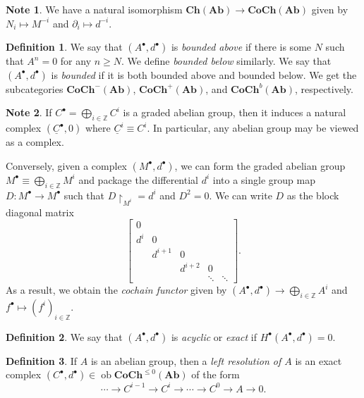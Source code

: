\documentclass[10pt,letterpaper,cm]{nupset}
\theoremstyle{definition}
\newtheorem*{definition}{Definition}
\newtheorem{note}{Note}
\newcommand{\Z}{\mathbb Z}
\newcommand{\1}{\mathbf{1}}
\newcommand{\0}{\vec 0}
\DeclareMathOperator{\ob}{ob}
\begin{document}
\begin{note}
We have a natural isomorphism $\mathbf{Ch}(\mathbf{Ab}) \to \mathbf{CoCh}(\mathbf{Ab})$ given by $N_i \mapsto M^{-i}$ and $\partial_i \mapsto d^{-i}$.
\end{note}

\begin{definition}
We say that $(A^{\bullet}, d^{\bullet})$ is \textit{bounded above} if there is some $N$ such that $A^n =0$ for any $n\geq N$. We define \textit{bounded below} similarly. We say that $(A^{\bullet}, d^{\bullet})$ is \textit{bounded} if it is both bounded above and bounded below. We get the subcategories $\mathbf{CoCh}^{{-}}(\mathbf{Ab})$, $\mathbf{CoCh}^{+}(\mathbf{Ab})$, and $\mathbf{CoCh}^{b}(\mathbf{Ab})$, respectively. 
\end{definition}

\begin{note}
If $C^{\bullet} = \bigoplus_{i\in \Z} C^i$ is a graded abelian group, then it induces a natural complex $(\underline{C}^{\bullet}, 0)$ where $\underline{C}^i \equiv C^i$. In particular, any abelian group may be viewed as a complex. 

Conversely, given a complex $(M^{\bullet}, d^{\bullet})$, we can form the graded abelian group $M^{\bullet} \equiv  \bigoplus_{i\in \Z} M^i$ and package the differential $d^i$ into a single group map $D: M^{\bullet} \to M^{\bullet}$ such that $D\restriction_{M^i} = d^i$ and $D^2 =0$. We can write $D$ as the block diagonal matrix
$$  \begin{bmatrix} 0 & & &  & \\  d^i &0   &  &  & \\  &  d^{i+1} & 0  &   & \\ &   & d^{i+2}  & 0   &   \\  &  & &  \ddots &   \ddots \end{bmatrix} .$$
As a result, we obtain the \textit{cochain functor} given by $(A^{\bullet}, d^{\bullet}) \to \bigoplus_{i\in \Z} A^i$ and $f^{\bullet} \mapsto (f^i)_{i\in \Z}$.
\end{note}

\begin{definition}
We say that $(A^{\bullet}, d^{\bullet})$ is \textit{acyclic} or \textit{exact} if $H^{\bullet}(A^{\bullet}, d^{\bullet})=0$.
\end{definition}

\begin{definition}
If $A$ is an abelian group, then a \textit{left resolution of $A$} is an exact complex $(C^{\bullet}, d^{\bullet}) \in \ob{\mathbf{CoCh}^{\leq 0}(\mathbf{Ab})}$  of the form $$\cdots \to C^{i-1} \to C^i \to \cdots \to  C^0 \to A \to 0 .$$
\end{definition}
\end{document}
